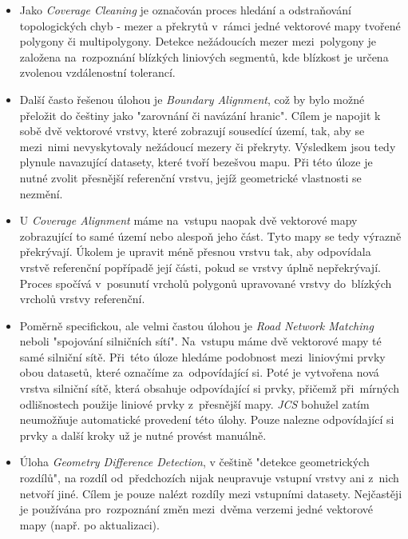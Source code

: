\begin{itemize}
 \item Jako \textit{Coverage Cleaning} je  označován proces hledání a odstraňování topologických chyb - mezer a překrytů v~rámci jedné vektorové mapy tvořené polygony či 
	multipolygony. Detekce nežádoucích mezer mezi~polygony je založena na~rozpoznání blízkých liniových segmentů, kde blízkost je určena zvolenou vzdálenostní tolerancí. 

 \item Další často řešenou úlohou je \textit{Boundary Alignment}, což by bylo možné přeložit do češtiny jako "zarovnání či navázání hranic". Cílem je napojit k sobě dvě 
	vektorové vrstvy, které zobrazují sousedící území, tak, aby se mezi~nimi nevyskytovaly nežádoucí mezery či překryty. Výsledkem jsou tedy plynule navazující datasety,
	které tvoří bezešvou mapu. Při této úloze je nutné zvolit přesnější referenční vrstvu, jejíž geometrické vlastnosti se nezmění.

 \item U \textit{Coverage Alignment} máme na~vstupu naopak dvě vektorové mapy zobrazující to samé území nebo alespoň jeho část. Tyto mapy se tedy výrazně překrývají. Úkolem
	je upravit méně přesnou vrstvu tak, aby odpovídala vrstvě referenční popřípadě její části, pokud se vrstvy úplně nepřekrývají. Proces spočívá v~posunutí vrcholů
	polygonů upravované vrstvy do~blízkých vrcholů vrstvy referenční.

 \item Poměrně specifickou, ale velmi častou úlohou je \textit{Road Network Matching} neboli "spojování silničních sítí". Na~vstupu máme dvě vektorové mapy té samé silniční
	sítě. Při~této úloze hledáme podobnost mezi~liniovými prvky obou datasetů, které označíme za~odpovídající si. Poté je vytvořena nová vrstva silniční sítě, která
	obsahuje odpovídající si prvky, přičemž při~mírných odlišnostech použije liniové prvky z~přesnější mapy. \textit{JCS} bohužel zatím neumožňuje automatické provedení
	této úlohy. Pouze nalezne odpovídající si prvky a další kroky už je nutné provést manuálně.

\item Úloha \textit{Geometry Difference Detection}, v češtině "detekce geometrických rozdílů", na rozdíl od~předchozích nijak neupravuje vstupní vrstvy ani z~nich netvoří jiné.
	Cílem je pouze nalézt rozdíly mezi vstupními datasety. Nejčastěji je používána pro~rozpoznání změn mezi~dvěma verzemi jedné vektorové mapy (např. po aktualizaci).
\end{itemize}

